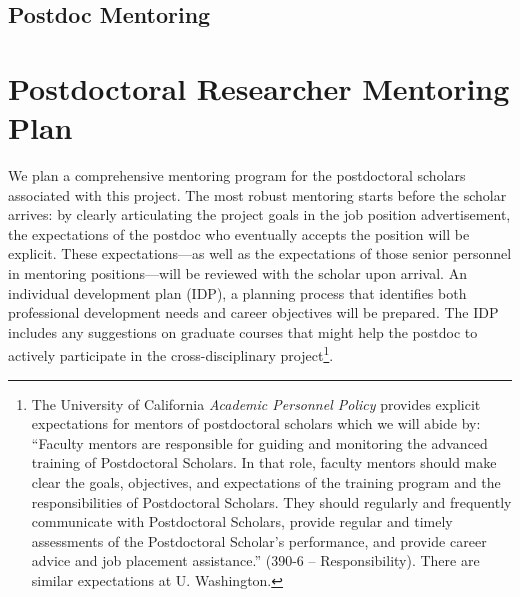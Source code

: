 \documentclass[11pt]{article}
\begin{document}
\subsection*{Postdoc Mentoring}

\section{Postdoctoral Researcher Mentoring Plan}

We plan a comprehensive mentoring program for the postdoctoral scholars
associated with this project. The most robust mentoring starts before
the scholar arrives: by clearly articulating the project goals in
the job position advertisement, the expectations of the postdoc who
eventually accepts the position will be explicit. These expectations---as
well as the expectations of those senior personnel in mentoring positions---will
be reviewed with the scholar upon arrival. An individual development plan (IDP), a planning process that 
identifies both professional development needs and career objectives 
will be prepared. The IDP  includes any suggestions on graduate courses 
that might help the postdoc to actively participate in the cross-disciplinary 
project\footnote{The University of California \textit{Academic Personnel Policy }provides
explicit expectations for mentors of postdoctoral scholars which we
will abide by: ``Faculty mentors are responsible for guiding and monitoring the
advanced training of Postdoctoral Scholars. In that role, faculty
mentors should make clear the goals, objectives, and expectations
of the training program and the responsibilities of Postdoctoral Scholars.
They should regularly and frequently communicate with Postdoctoral
Scholars, provide regular and timely assessments of the Postdoctoral
Scholar's performance, and provide career advice and job placement
assistance.'' (390-6 -- Responsibility). There are similar expectations at U. Washington.}. 
\end{document}
